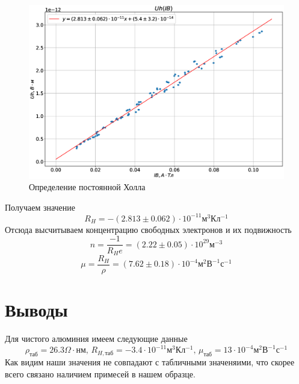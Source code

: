 \documentclass{article}
\begin{document}
\begin{figure}[h]
    \begin{center}
        \includegraphics[width=1\textwidth]{plot.eps}
    \end{center}
    \caption{Определение постоянной Холла}
\label{plit}
\end{figure}

Получаем значение
\begin{equation}
    R_H = -(2.813 \pm 0.062) \cdot 10^{-11} м^3 Кл^{-1}
\end{equation}
Отсюда высчитываем концентрацию свободных электронов и их подвижность
\begin{equation}
    n = \frac{-1}{R_H e} = (2.22 \pm 0.05) \cdot 10^{29} м^{-3}
\end{equation}
\begin{equation}
    \mu=\frac{R_{H}}{\rho}=(7.62 \pm 0.18) \cdot 10^{-4} м^2В^{-1}с^{-1}
\end{equation}

\section{Выводы}
Для чистого алюминия имеем следующие данные
\begin{equation}
    \rho_{таб}=26.3 \Omega \cdot нм \text{,  }
    R_{H,таб}=-3.4 \cdot 10^{-11}м^{3}Кл^{-1} \text{,  }
    \mu_{таб}=13\cdot 10^{-4}м^{2}В^{-1}с^{-1}
\end{equation}
Как видим наши значения не совпадают с табличными значеняими, что скорее всего связано
наличием примесей в нашем образце.
\end{document}
